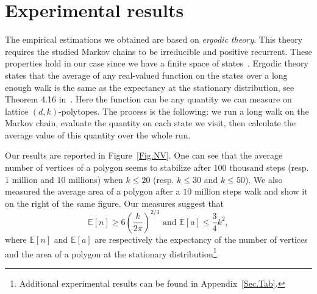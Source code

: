 \documentclass[a4paper]{article}
\newtheorem{theorem}{Theorem}
\begin{document}



\section{Experimental results}\label{Sec.Res}

The empirical estimations we obtained are based on \textit{ergodic theory}. This theory requires the studied Markov chains to be irreducible and positive recurrent. These properties hold in our case since we have a finite space of states~\cite{levin2009markov}. Ergodic theory states that the average of any real-valued function on the states over a long enough walk is the same as the expectancy at the stationary distribution, see Theorem 4.16 in~\cite{levin2009markov}. Here the function can be any quantity we can measure on lattice $(d,k)$-polytopes. The process is the following: we run a long walk on the Markov chain, evaluate the quantity on each state we visit, then calculate the average value of this quantity over the whole run. %

Our results are reported in Figure~\ref{Fig.NV}. One can see that the average number of vertices of a polygon seems to stabilize after $100$ thousand steps (resp. $1$ million and $10$ millions) when $k\leq 20$ (resp. $k\leq 30$ and $k\leq 50$).
We also measured the average area of a polygon after a $10$ million steps walk and show it on the right of the same figure. Our measures suggest that
$$
\mathbb{E}[n] \ge 6\left(\frac{k}{2\pi}\right)^{2/3} \text{ and } \mathbb{E}[a] \leq \frac{3}{4} k^2,
$$
where $\mathbb{E}[n]$ and $\mathbb{E}[a]$ are respectively the expectancy of the number of vertices and the area of a polygon at the stationary distribution\footnote{Additional experimental results can be found in Appendix~\ref{Sec.Tab}.}.
\end{document}
